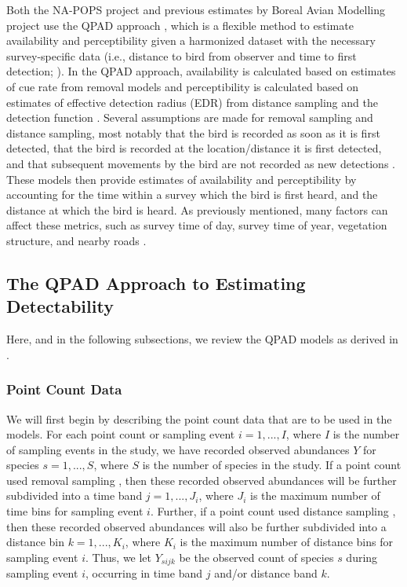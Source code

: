 \documentclass[12pt]{article}
\begin{document}
\par Both the NA-POPS project and previous estimates by Boreal Avian Modelling project use the QPAD approach \citep{solymos_calibrating_2013}, which is a flexible method to estimate availability and perceptibility given a harmonized dataset \citep{barker_ecological_2015} with the necessary survey-specific data (i.e., distance to bird from observer and time to first detection; \citet{barker_ecological_2015}).
In the QPAD approach, availability is calculated based on estimates of cue rate from removal models \citep{farnsworth_removal_2002, alldredge_time--detection_2007} and perceptibility is calculated based on estimates of effective detection radius (EDR) from distance sampling and the detection function \citep{buckland_introduction_2001}.
Several assumptions are made for removal sampling and distance sampling, most notably that the bird is recorded as soon as it is first detected, that the bird is recorded at the location/distance it is first detected, and that subsequent movements by the bird are not recorded as new detections \citep{buckland_distance_2015, farnsworth_removal_2002, alldredge_time--detection_2007}.
These models then provide estimates of availability and perceptibility by accounting for the time within a survey which the bird is first heard, and the distance at which the bird is heard.
As previously mentioned, many factors can affect these metrics, such as survey time of day, survey time of year, vegetation structure, and nearby roads \citep{edwards_point_2023}.

\subsection{The QPAD Approach to Estimating Detectability}
\par Here, and in the following subsections, we review the QPAD models as derived in \citet{solymos_calibrating_2013}.

\subsubsection{Point Count Data}
\par We will first begin by describing the point count data that are to be used in the models.
For each point count or sampling event $i = 1,...,I$, where $I$ is the number of sampling events in the study, we have recorded observed abundances $Y$ for species $s = 1,...,S$, where $S$ is the number of species in the study.
If a point count used removal sampling \citep{alldredge_time--detection_2007, farnsworth_removal_2002}, then these recorded observed abundances will be further subdivided into a time band $j = 1,...,J_i$, where $J_i$ is the maximum number of time bins for sampling event $i$.
Further, if a point count used distance sampling \citep{buckland_introduction_2001, buckland_distance_2015}, then these recorded observed abundances will also be further subdivided into a distance bin $k = 1,...,K_i$, where $K_i$ is the maximum number of distance bins for sampling event $i$.
Thus, we let $Y_{sijk}$ be the observed count of species $s$ during sampling event $i$, occurring in time band $j$ and/or distance band $k$.
\end{document}
